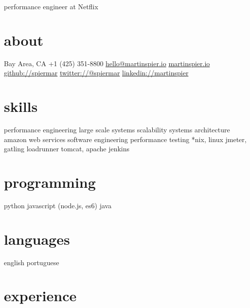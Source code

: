 \documentclass[]{mspier-cv}
\begin{document}
       {performance engineer at Netflix}

\begin{aside}
  \section{about}
    {Bay Area, CA}
    {+1 (425) 351-8800}
    \href{mailto:hello@martinspier.io}{hello@martinspier.io}
    \href{http://martinspier.io}{martinspier.io}
    \href{https://github.com/spiermar}{github://spiermar}
    \href{https://twitter.com/spiermar}{twitter://@spiermar}
    \href{https://www.linkedin.com/in/martinspier}{linkedin://martinspier}
  \section{skills}
    performance engineering
    large scale systems
    scalability
    systems architecture
    amazon web services
    software engineering
    performance testing
    *nix, linux
    jmeter, gatling
    loadrunner
    tomcat, apache
    jenkins
  \section{programming}
    python
    javascript
    (node.js, es6)
    java
  \section{languages}
    english
    portuguese
\end{aside}

\section{experience}
\end{document}
